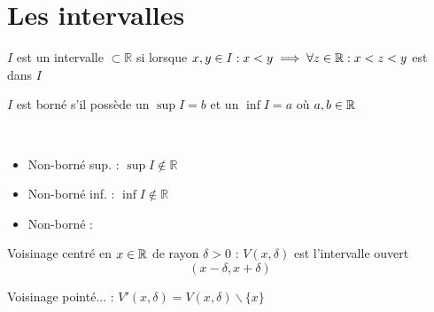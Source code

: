 \section{Les intervalles}
	\begin{mydef}
		$I$ est un intervalle $\subset\mathbb{R}$ si lorsque $x,y\in I : x<y\implies \forall z\in\mathbb{R} : x<z<y$ est dans $I$
	\end{mydef}
	\begin{mydef}
		$I$ est borné s'il possède un $\sup I =b$ et un $\inf I =a$ où $a,b\in\mathbb{R}$
	\end{mydef}
	\begin{mydef}
		~
		\begin{itemize}
			\item Non-borné sup. : $\sup I \notin\mathbb{R}$
			\item Non-borné inf. : $\inf I \notin\mathbb{R}$
			\item Non-borné  : 
		\end{itemize}
	\end{mydef}
	\begin{mydef}
		Voisinage centré en $x\in\mathbb{R}$ de rayon $\delta>0$ : $V(x,\delta)$ est l'intervalle ouvert \[(x-\delta,x+\delta)\]
	\end{mydef}
	\begin{mydef}
		Voisinage pointé... : $V'(x,\delta)=V(x,\delta)\backslash\{x\}$
	\end{mydef}